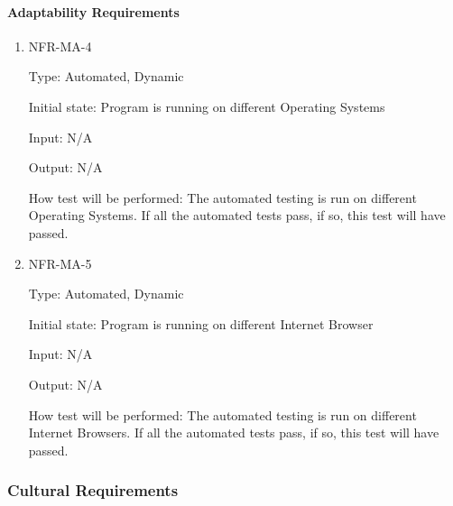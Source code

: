 \documentclass[12pt, titlepage]{article}
\begin{document}
\paragraph{Adaptability Requirements}

\begin{enumerate}

\item{NFR-MA-4\\}

Type: Automated, Dynamic 

Initial state: Program is running on different Operating Systems 

Input: N/A 

Output: N/A 

How test will be performed: The automated testing is run on different Operating Systems. If all the automated tests pass, if so, this test will have passed.

\item{NFR-MA-5\\}

Type: Automated, Dynamic 

Initial state: Program is running on different Internet Browser 

Input: N/A 

Output: N/A 

How test will be performed: The automated testing is run on different Internet Browsers. If all the automated tests pass, if so, this test will have passed. 

\end{enumerate}

\subsubsection{Cultural Requirements}
\end{document}
